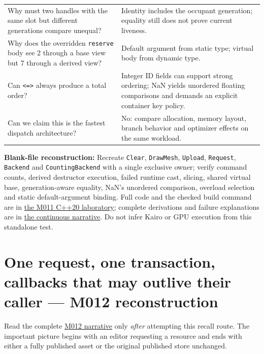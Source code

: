 {\begin{longtable}[]{@{}
  >{\raggedright\arraybackslash}p{}
  >{\raggedright\arraybackslash}p{}@{}}
Why must two handles with the same slot but different generations compare unequal? & Identity includes the occupant generation; equality still does not prove current liveness. \\
Why does the overridden \texttt{reserve} body see 2 through a base view but 7 through a derived view? & Default argument from static type; virtual body from dynamic type. \\
Can \texttt{\textless{}=\textgreater{}} always produce a total order? & Integer ID fields can support strong ordering; NaN yields unordered floating comparisons and demands an explicit container key policy. \\
Can we claim this is the fastest dispatch architecture? & No: compare allocation, memory layout, branch behavior and optimizer effects on the same workload. \\
\end{longtable}
}

\textbf{Blank-file reconstruction:} Recreate \texttt{Clear}, \texttt{DrawMesh}, \texttt{Upload}, \texttt{Request}, \texttt{Backend} and \texttt{CountingBackend} with a single exclusive owner; verify command counts, derived destructor execution, failed runtime cast, slicing, shared virtual base, generation-aware equality, NaN's unordered comparison, overload selection and static default-argument binding. Full code and the checked build command are in \href{tools/labs/backend_choice_lab.cpp}{the M011 C++20 laboratory}; complete derivations and failure explanations are in \href{Continuous\%20Notes/Computing\%20Foundations\%20-\%20From\%20Bits\%20to\%20C++\%20and\%20Systems\%20APIs\#From\%20one\%20owned\%20resource\%20to\%20many\%20requests\%20and\%20a\%20replaceable\%20backend}{the continuous narrative}. Do not infer Kairo or GPU execution from this standalone test.

\section{One request, one transaction, callbacks that may outlive their caller --- M012 reconstruction}\label{appendix-960160274237-one-request-one-transaction-callbacks-that-may-outlive-their-caller-m012-reconstruction}

Read the complete \href{Continuous\%20Notes/Computing\%20Foundations\%20-\%20From\%20Bits\%20to\%20C++\%20and\%20Systems\%20APIs\#From\%20an\%20accepted\%20render\%20request\%20to\%20a\%20resource\%20that\%20survives\%20failures\%20and\%20callbacks}{M012 narrative} only \emph{after} attempting this recall route. The important picture begins with an editor requesting a resource and ends with either a fully published asset or the original published store unchanged.

